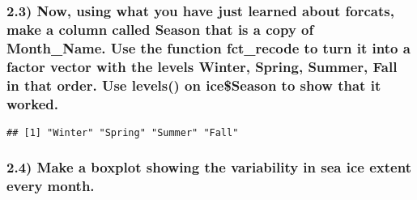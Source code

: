 \documentclass[]{article}
\newenvironment{Shaded}{\begin{snugshade}}{\end{snugshade}}
\newcommand{\KeywordTok}[1]{\textcolor[rgb]{0.13,0.29,0.53}{\textbf{#1}}}
\newcommand{\DataTypeTok}[1]{\textcolor[rgb]{0.13,0.29,0.53}{#1}}
\newcommand{\StringTok}[1]{\textcolor[rgb]{0.31,0.60,0.02}{#1}}
\newcommand{\OperatorTok}[1]{\textcolor[rgb]{0.81,0.36,0.00}{\textbf{#1}}}
\newcommand{\NormalTok}[1]{#1}
\begin{document}
\subsubsection{2.3) Now, using what you have just learned about forcats,
make a column called Season that is a copy of Month\_Name. Use the
function fct\_recode to turn it into a factor vector with the levels
Winter, Spring, Summer, Fall in that order. Use levels() on ice\$Season
to show that it
worked.}\label{now-using-what-you-have-just-learned-about-forcats-make-a-column-called-season-that-is-a-copy-of-month_name.-use-the-function-fct_recode-to-turn-it-into-a-factor-vector-with-the-levels-winter-spring-summer-fall-in-that-order.-use-levels-on-iceseason-to-show-that-it-worked.}

\begin{Shaded}
\end{Shaded}

\begin{verbatim}
## [1] "Winter" "Spring" "Summer" "Fall"
\end{verbatim}

\subsubsection{2.4) Make a boxplot showing the variability in sea ice
extent every
month.}\label{make-a-boxplot-showing-the-variability-in-sea-ice-extent-every-month.}

\begin{Shaded}
\end{Shaded}
\end{document}
